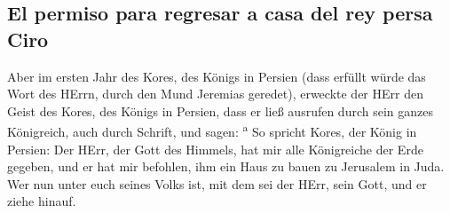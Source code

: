 \hypertarget{el-permiso-para-regresar-a-casa-del-rey-persa-ciro}{%
\subsection{El permiso para regresar a casa del rey persa
Ciro}\label{el-permiso-para-regresar-a-casa-del-rey-persa-ciro}}

 Aber im ersten Jahr des Kores, des Königs in Persien
(dass erfüllt würde das Wort des HErrn, durch den Mund Jeremias
geredet), erweckte der HErr den Geist des Kores, des Königs in Persien,
dass er ließ ausrufen durch sein ganzes Königreich, auch durch Schrift,
und sagen: \textsuperscript{a}  So spricht Kores, der
König in Persien: Der HErr, der Gott des Himmels, hat mir alle
Königreiche der Erde gegeben, und er hat mir befohlen, ihm ein Haus zu
bauen zu Jerusalem in Juda. Wer nun unter euch seines Volks ist, mit dem
sei der HErr, sein Gott, und er ziehe hinauf.
